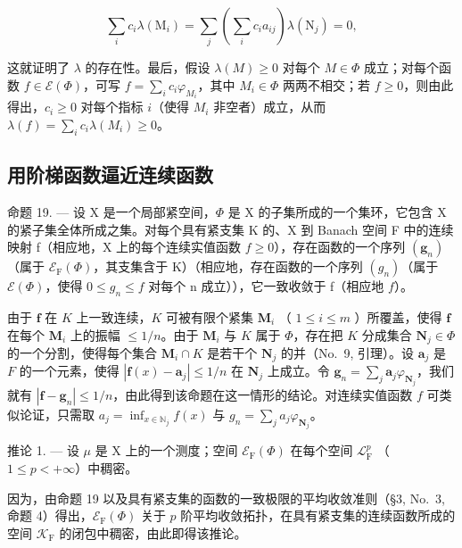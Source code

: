 \[
\sum_ {i} c _ {i} \lambda (\mathrm{M} _ {i}) = \sum_ {j} \left(\sum_ {i} c _ {i} a _ {i j}\right) \lambda (\mathrm{N} _ {j}) = 0,
\]

这就证明了 \(\lambda\) 的存在性。最后，假设 \(\lambda(M) \geqslant 0\) 对每个 \(M \in \Phi\) 成立；对每个函数 \(f \in \mathcal{E}(\Phi)\)，可写 \(f = \sum_{i} c_i \varphi_{M_i}\)，其中 \(M_i \in \Phi\) 两两不相交；若 \(f \geqslant 0\)，则由此得出，\(c_i \geqslant 0\) 对每个指标 \(i\)（使得 \(M_i\) 非空者）成立，从而 \(\lambda(f) = \sum_{i} c_i \lambda(M_i) \geqslant 0\)。

\subsection{用阶梯函数逼近连续函数}

命题 19. --- 设 X 是一个局部紧空间，\(\Phi\) 是 X 的子集所成的一个集环，它包含 X 的紧子集全体所成之集。对每个具有紧支集 K 的、X 到 Banach 空间 F 中的连续映射 f（相应地，X 上的每个连续实值函数 \(f \geqslant 0\)），存在函数的一个序列 \((\mathbf{g}_n)\)（属于 \(\mathcal{E}_{\mathrm{F}}(\Phi)\)，其支集含于 K）（相应地，存在函数的一个序列 \((g_n)\)（属于 \(\mathcal{E}(\Phi)\)，使得 \(0 \leqslant g_n \leqslant f\) 对每个 n 成立）），它一致收敛于 f（相应地 \(f\)）。

由于 \(\mathbf{f}\) 在 \(K\) 上一致连续，\(K\) 可被有限个紧集 \(\mathbf{M}_i\) （ \(1 \leqslant i \leqslant m\) ）所覆盖，使得 \(\mathbf{f}\) 在每个 \(\mathbf{M}_i\) 上的振幅 \(\leqslant 1/n\)。由于 \(\mathbf{M}_i\) 与 \(K\) 属于 \(\Phi\)，存在把 \(K\) 分成集合 \(\mathbf{N}_j \in \Phi\) 的一个分割，使得每个集合 \(\mathbf{M}_i \cap K\) 是若干个 \(\mathbf{N}_j\) 的并（No.~9, 引理）。设 \(\mathbf{a}_j\) 是 \(F\) 的一个元素，使得 \(|\mathbf{f}(x) - \mathbf{a}_j| \leqslant 1/n\) 在 \(\mathbf{N}_j\) 上成立。令 \(\mathbf{g}_n = \sum_j \mathbf{a}_j \varphi_{\mathbf{N}_j}\)，我们就有 \(|\mathbf{f} - \mathbf{g}_n| \leqslant 1/n\)，由此得到该命题在这一情形的结论。对连续实值函数 \(f\) 可类似论证，只需取 \(a_j = \inf_{x \in \mathbb{N}_j} f(x)\) 与 \(g_n = \sum_j a_j \varphi_{\mathbf{N}_j}\)。

推论 1. --- 设 \(\mu\) 是 X 上的一个测度；空间 \(\mathcal{E}_{\mathrm{F}}(\Phi)\) 在每个空间 \(\mathcal{L}_{\mathrm{F}}^{p}\) （ \(1 \leqslant p < +\infty\)）中稠密。

因为，由命题 19 以及具有紧支集的函数的一致极限的平均收敛准则（§3, No.~3, 命题 4）得出，\(\mathcal{E}_{\mathrm{F}}(\Phi)\) 关于 \(p\) 阶平均收敛拓扑，在具有紧支集的连续函数所成的空间 \(\mathcal{K}_{\mathrm{F}}\) 的闭包中稠密，由此即得该推论。

